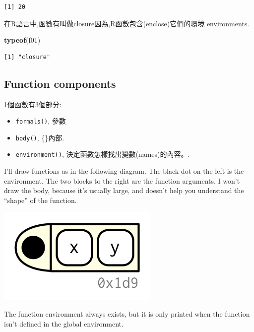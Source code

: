 \documentclass[]{book}
\newenvironment{Shaded}{\begin{snugshade}}{\end{snugshade}}
\newcommand{\KeywordTok}[1]{\textcolor[rgb]{0.13,0.29,0.53}{\textbf{#1}}}
\newcommand{\NormalTok}[1]{#1}
\theoremstyle{definition}
\theoremstyle{definition}
\theoremstyle{definition}
\theoremstyle{remark}
\begin{document}
\begin{verbatim}
[1] 20
\end{verbatim}

在R語言中,函數有叫做closure因為,R函數包含(enclose)它們的環境
environments.

\begin{Shaded}
\begin{Highlighting}[]
\KeywordTok{typeof}\NormalTok{(f01)}
\end{Highlighting}
\end{Shaded}

\begin{verbatim}
[1] "closure"
\end{verbatim}

\hypertarget{function-components}{%
\subsection{Function components}\label{function-components}}

1個函數有3個部分:

\begin{itemize}
\item
  \texttt{formals()}, 參數
\item
  \texttt{body()}, \{\}內部.
\item
  \texttt{environment()}, 決定函數怎樣找出變數(names)的內容。.
\end{itemize}

I'll draw functions as in the following diagram. The black dot on the
left is the environment. The two blocks to the right are the function
arguments. I won't draw the body, because it's usually large, and
doesn't help you understand the ``shape'' of the function.

\begin{center}\includegraphics{diagrams/functions/components} \end{center}

The function environment always exists, but it is only printed when the
function isn't defined in the global environment.
\end{document}
